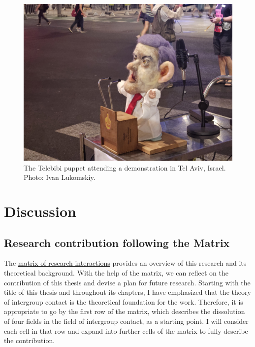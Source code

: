 \documentclass[dissertation,math,vertlayout,pdfa,colorlinks]{aaltoseries}
\begin{document}
\begin{figure}
    \includegraphics[width=1\linewidth]{telebibi.jpg}
    \caption{The Telebibi puppet attending a demonstration in Tel Aviv, Israel. Photo: Ivan Lukomskiy.}
    \label{fig:telebibi-pilot}
\end{figure}

\chapter{Discussion}

\section{Research contribution following the Matrix}
The \hyperref[sec:matrix_of_intersections]{matrix of research interactions} provides an overview of this research and its theoretical background. With the help of the matrix, we can reflect on the contribution of this thesis and devise a plan for future research. Starting with the title of this thesis and throughout its chapters, I have emphasized that the theory of intergroup contact is the theoretical foundation for the work. Therefore, it is appropriate to go by the first row of the matrix, which describes the dissolution of four fields in the field of intergroup contact, as a starting point. I will consider each cell in that row and expand into further cells of the matrix to fully describe the contribution.
\end{document}

